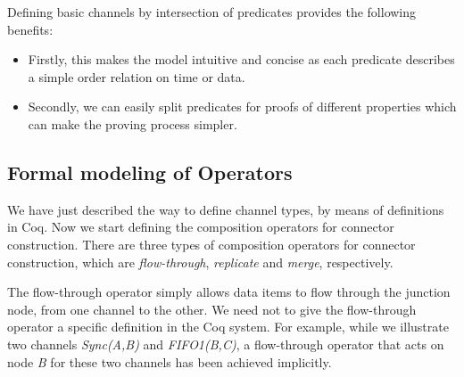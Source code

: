 \documentclass[preprint,3p]{elsarticle}
\begin{document}


Defining basic channels by intersection of predicates provides the following benefits:
\begin{itemize}
\item Firstly, this makes the model intuitive and concise as each predicate describes a simple order relation on time or data.
\item Secondly, we can easily split predicates for proofs of different properties which can make the proving process simpler.
\end{itemize}

\subsection{Formal modeling of Operators}
We have just described the way to define channel types, by means of definitions in Coq. Now we start defining the composition operators for connector construction. There are three types of composition operators for connector construction, which are \emph{flow-through}, \emph{replicate} and \emph{merge}, respectively.

The flow-through operator simply allows data items to flow through the junction node, from one channel to the other. We need not to give the flow-through operator a specific definition in the Coq system. For example, while we illustrate two channels \emph{Sync(A,B)} and \emph{FIFO1(B,C)}, a flow-through operator that acts on node \emph{B} for these two channels has been achieved implicitly.
\end{document}
